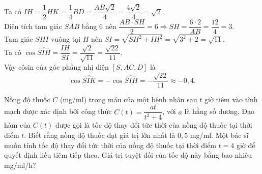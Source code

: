 \begin{ex}
{		Ta có $IH=\dfrac{1}{2}HK=\dfrac{1}{4}BD=\dfrac{AB\sqrt{2}}{4}=\dfrac{4\sqrt{2}}{4}=\sqrt{2}$.\\
		Diện tích tam giác $SAB$ bằng $6$ nên $\dfrac{AB\cdot SH}{2}=6\Rightarrow SH=\dfrac{6\cdot 2}{AB}=\dfrac{12}{4}=3$.\\
		Tam giác $SHI$ vuông tại $H$ nên $SI=\sqrt{SH^2+IH^2}=\sqrt{3^2+2}=\sqrt{11}$.\\
		Ta có $\cos\widehat{SIH}=\dfrac{IH}{SI}=\dfrac{\sqrt{2}}{\sqrt{11}}=\dfrac{\sqrt{22}}{11}$.\\
		Vậy côsin của góc phẳng nhị diện $[S,AC,D]$ là
		\[\cos\widehat{SIK}=-\cos\widehat{SIH}=-\dfrac{\sqrt{22}}{11}\approx -0{,}4.\]
	}
\end{ex}

\begin{ex}%
	Nồng độ thuốc $C$ (mg/ml) trong máu của một bệnh nhân sau $t$ giờ tiêm vào tĩnh mạch được xác định bởi công thức $C(t) = \dfrac{at}{t^2 + 4}$, với $a$ là hằng số dương. Đạo hàm của $C(t)$ được gọi là tốc độ thay đổi tức thời của nồng độ thuốc tại thời điểm $t$. Biết rằng nồng độ thuốc đạt giá trị lớn nhất là $0{,}5$ mg/ml. Một bác sĩ muốn tính tốc độ thay đổi tức thời của nồng độ thuốc tại thời điểm $t = 4$ giờ để quyết định liều tiêm tiếp theo. Giá trị tuyệt đối của tốc độ này bằng bao nhiêu mg/ml/h?
	\par{}
\end{ex}

